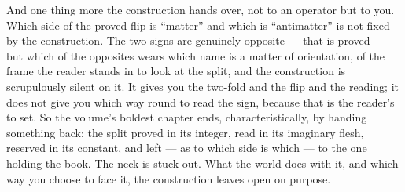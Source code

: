 And one thing more the construction hands over, not to an operator but to you. Which side of the proved flip is
``matter'' and which is ``antimatter'' is not fixed by the construction. The two signs are genuinely opposite ---
that is proved --- but which of the opposites wears which name is a matter of orientation, of the frame the reader
stands in to look at the split, and the construction is scrupulously silent on it. It gives you the two-fold and
the flip and the reading; it does not give you which way round to read the sign, because that is the reader's to
set. So the volume's boldest chapter ends, characteristically, by handing something back: the split proved in its
integer, read in its imaginary flesh, reserved in its constant, and left --- as to which side is which --- to the
one holding the book. The neck is stuck out. What the world does with it, and which way you choose to face it, the
construction leaves open on purpose.
